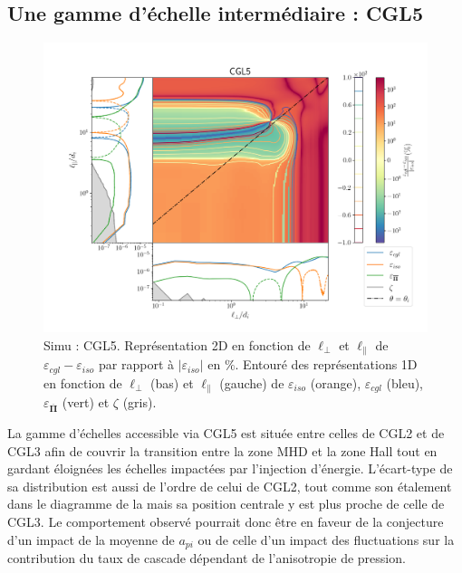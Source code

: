 \subsection{Une gamme d'échelle intermédiaire : CGL5}
\begin{figure}[!ht]
 \centering
 \includegraphics[width=0.95\linewidth,trim=1cm 1cm 0cm 2cm, clip=true]{./Part_3/images_ch3/CGL5_panel_isocgl_percent}
 \cprotect\caption{Simu : CGL5. Représentation 2D en fonction de $\ell_{\perp}$ et $\ell_{\parallel}$ de $\varepsilon_{cgl}-\varepsilon_{iso}$ par rapport à $|\varepsilon_{iso}|$ en $\%$. Entouré des représentations 1D en fonction de $\ell_{\perp}$ (bas) et $\ell_{\parallel}$ (gauche) de $\varepsilon_{iso}$ (orange), $\varepsilon_{cgl}$ (bleu), $\varepsilon_{\overline{\boldsymbol{\Pi}}} $ (vert) et $\zeta$ (gris). }
\label{fig:trip_CGL5}
\end{figure}

La gamme d'échelles accessible via CGL5 est située entre celles de CGL2 et de CGL3 afin de couvrir la transition entre la zone \acs{MHD} et la zone \acs{Hall} tout en gardant éloignées les échelles impactées par l'injection d'énergie. %
L'écart-type de sa distribution est aussi de l'ordre de celui de CGL2, tout comme son étalement dans le diagramme de la  mais sa position centrale y est plus proche de celle de CGL3. Le comportement observé pourrait donc être en faveur de la conjecture d'un impact de la moyenne de $a_{pi}$ ou de celle d'un impact des fluctuations sur la contribution du taux de cascade dépendant de l'anisotropie de pression. 



